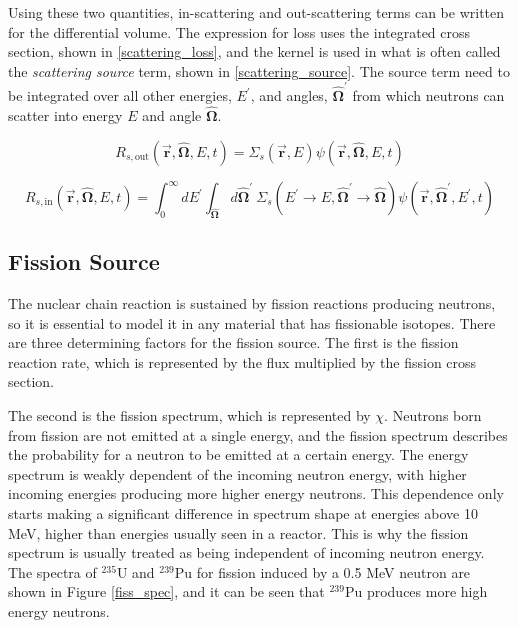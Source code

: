 Using these two quantities, in-scattering and out-scattering terms can be written for the differential volume.  The expression for loss uses the integrated cross section, shown in \eqref{scattering_loss}, and the kernel is used in what is often called the \emph{scattering source} term, shown in \eqref{scattering_source}.  The source term need to be integrated over all other energies, $E^\prime$, and angles, $\boldsymbol{\hat{\Omega}}^\prime$ from which neutrons can scatter into energy $E$ and angle $\boldsymbol{\hat{\Omega}}$.

\begin{equation}
\label{scattering_loss}
R_{s, \mathrm{out}}( \boldsymbol{\vec{r}},\boldsymbol{\hat{\Omega}},E,t ) = \Sigma_s (\boldsymbol{\vec{r}},E) \psi(\boldsymbol{\vec{r}},\boldsymbol{\hat{\Omega}},E,t)
 \end{equation}
 
 \begin{equation}
\label{scattering_source}
R_{s, \mathrm{in}}(\boldsymbol{\vec{r}},\boldsymbol{\hat{\Omega}},E,t) = \int_0^\infty dE^\prime \int_{\boldsymbol{\hat{\Omega}}} d\boldsymbol{\hat{\Omega}}^\prime \: \Sigma_s(E^\prime \rightarrow E,\boldsymbol{\hat{\Omega}}^\prime \rightarrow \boldsymbol{\hat{\Omega}}) \psi(\boldsymbol{\vec{r}},\boldsymbol{\hat{\Omega}}^\prime,E^\prime,t)  
 \end{equation}
 
 \subsection{Fission Source}

The nuclear chain reaction is sustained by fission reactions producing neutrons, so it is essential to model it in any material that has fissionable isotopes.  There are three determining factors for the fission source.  The first is the fission reaction rate, which is represented by the flux multiplied by the fission cross section.  

The second is the fission spectrum, which is represented by $\chi$.  Neutrons born from fission are not emitted at a single energy, and the fission spectrum describes the probability for a neutron to be emitted at a certain energy.  The energy spectrum is weakly dependent of the incoming neutron energy, with higher incoming energies producing more higher energy neutrons.  This dependence only starts making a significant difference in spectrum shape at energies above 10 MeV, higher than energies usually seen in a reactor.  This is why the fission spectrum is usually treated as being independent of incoming neutron energy. The spectra of $^{235}$U and $^{239}$Pu for fission induced by a 0.5 MeV neutron are shown in Figure \ref{fiss_spec}, and it can be seen that $^{239}$Pu produces more high energy neutrons.  

